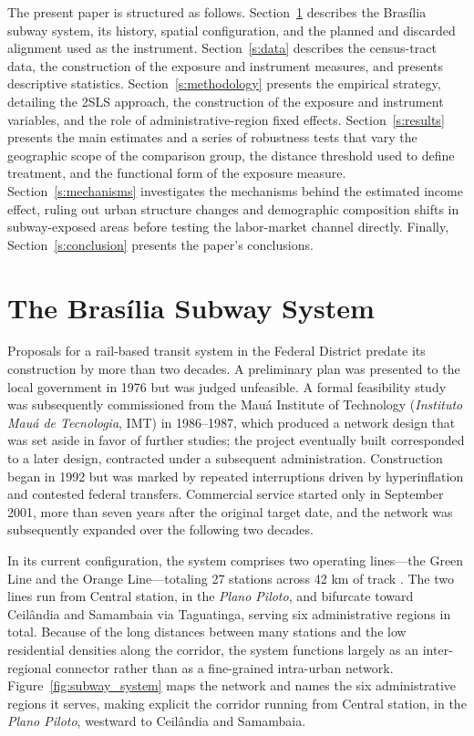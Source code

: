 The present paper is structured as follows. Section~\ref{s:subway} describes the Brasília subway system, its history, spatial configuration, and the planned and discarded alignment used as the instrument. Section~\ref{s:data} describes the census-tract data, the construction of the exposure and instrument measures, and presents descriptive statistics. Section~\ref{s:methodology} presents the empirical strategy, detailing the 2SLS approach, the construction of the exposure and instrument variables, and the role of administrative-region fixed effects. Section~\ref{s:results} presents the main estimates and a series of robustness tests that vary the geographic scope of the comparison group, the distance threshold used to define treatment, and the functional form of the exposure measure. Section~\ref{s:mechanisms} investigates the mechanisms behind the estimated income effect, ruling out urban structure changes and demographic composition shifts in subway-exposed areas before testing the labor-market channel directly. Finally, Section~\ref{s:conclusion} presents the paper's conclusions.

\section{The Brasília Subway System}\label{s:subway}

Proposals for a rail-based transit system in the Federal District predate its construction by more than two decades. A preliminary plan was presented to the local government in 1976 but was judged unfeasible. A formal feasibility study was subsequently commissioned from the Mauá Institute of Technology (\textit{Instituto Mauá de Tecnologia}, IMT) in 1986--1987, which produced a network design that was set aside in favor of further studies; the project eventually built corresponded to a later design, contracted under a subsequent administration. Construction began in 1992 but was marked by repeated interruptions driven by hyperinflation and contested federal transfers. Commercial service started only in September 2001, more than seven years after the original target date, and the network was subsequently expanded over the following two decades.

In its current configuration, the system comprises two operating lines---the Green Line and the Orange Line---totaling 27 stations across 42 km of track \citep{institutomdt2019evolucao}. The two lines run from Central station, in the \textit{Plano Piloto}, and bifurcate toward Ceilândia and Samambaia via Taguatinga, serving six administrative regions in total. Because of the long distances between many stations and the low residential densities along the corridor, the system functions largely as an inter-regional connector rather than as a fine-grained intra-urban network. Figure~\ref{fig:subway_system} maps the network and names the six administrative regions it serves, making explicit the corridor running from Central station, in the \textit{Plano Piloto}, westward to Ceilândia and Samambaia.


